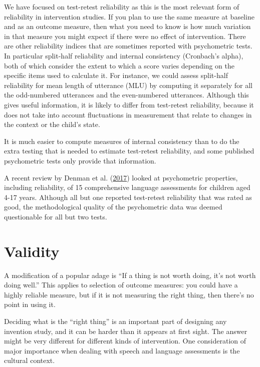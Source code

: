 \documentclass{krantz}
\begin{document}
We have focused on test-retest reliability as this is the most relevant form of reliability in intervention studies. If you plan to use the same measure at baseline and as an outcome measure, then what you need to know is how much variation in that measure you might expect if there were no effect of intervention. There are other reliability indices that are sometimes reported with psychometric tests. In particular split-half reliability and internal consistency (Cronbach's alpha), both of which consider the extent to which a score varies depending on the specific items used to calculate it. For instance, we could assess split-half reliability for mean length of utterance (MLU) by computing it separately for all the odd-numbered utterances and the even-numbered utterances. Although this gives useful information, it is likely to differ from test-retest reliability, because it does not take into account fluctuations in measurement that relate to changes in the context or the child's state.

It is much easier to compute measures of internal consistency than to do the extra testing that is needed to estimate test-retest reliability, and some published psychometric tests only provide that information.

A recent review by Denman et al. (\protect\hyperlink{ref-denman2017}{2017}) looked at psychometric properties, including reliability, of 15 comprehensive language assessments for children aged 4-17 years. Although all but one reported test-retest reliability that was rated as good, the methodological quality of the psychometric data was deemed questionable for all but two tests.

\hypertarget{validity}{%
\section{Validity}\label{validity}}

A modification of a popular adage is ``If a thing is not worth doing, it's not worth doing well.'' This applies to selection of outcome measures: you could have a highly reliable measure, but if it is not measuring the right thing, then there's no point in using it.

Deciding what is the ``right thing'' is an important part of designing any invention study, and it can be harder than it appears at first sight. The answer might be very different for different kinds of intervention. One consideration of major importance when dealing with speech and language assessments is the cultural context.
\end{document}
